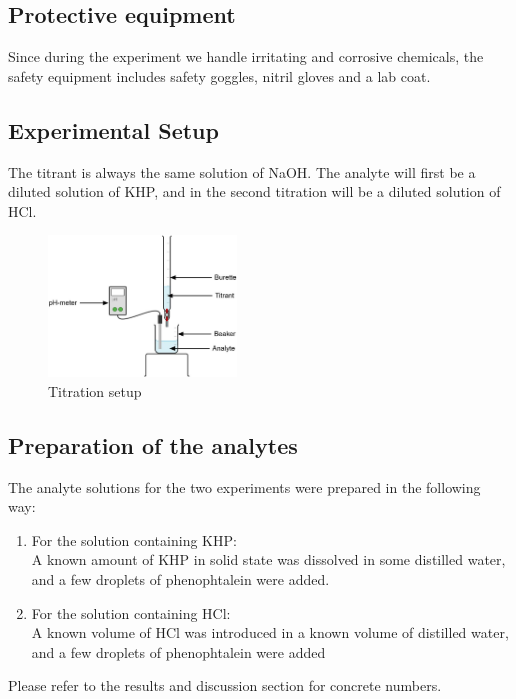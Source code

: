 \documentclass[twocolumn]{article}
\begin{document}
\subsection{Protective equipment}
Since during the experiment we handle irritating and corrosive chemicals, the safety equipment includes safety goggles, nitril gloves and a lab coat.
\subsection{Experimental Setup}
The titrant is always the same solution of NaOH. The analyte will first be a diluted solution of KHP, and in the second titration will be a diluted solution of HCl.
\begin{figure}[!htbp]
    \centering
    \includegraphics[width= 5cm]{Chemistry2_TP1_Setup.jpg}
    \caption{Titration setup}
    \label{fig:1}
\end{figure}
\FloatBarrier
\subsection{Preparation of the analytes}
The analyte solutions for the two experiments were prepared in the following way:
\begin{enumerate}
    \item For the solution containing KHP: \\ A known amount of KHP in solid state was dissolved in some distilled water, and a few droplets of phenophtalein were added.
    \item For the solution containing HCl: \\ A known volume of HCl was introduced in a known volume of distilled water, and a few droplets of phenophtalein were added
\end{enumerate}
Please refer to the results and discussion section for concrete numbers.
\end{document}
